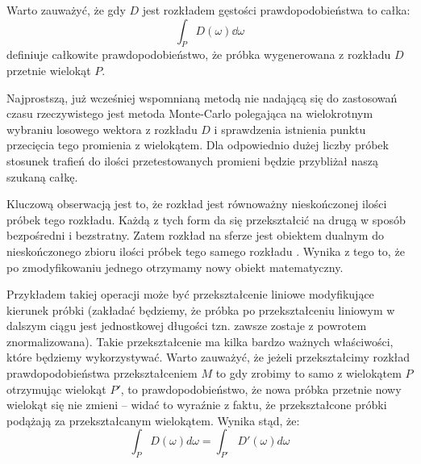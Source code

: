 \documentclass[../main.tex]{subfiles}
\begin{document}
%    

Warto zauważyć, że gdy $D$ jest rozkładem gęstości prawdopodobieństwa to całka:
\[
\int_P {
    D(\omega)
    \dd \omega
}
\]
\noindent definiuje całkowite prawdopodobieństwo, że próbka wygenerowana z rozkładu $D$ przetnie wielokąt $P$.

Najprostszą, już wcześniej wspomnianą metodą nie nadającą się do zastosowań czasu rzeczywistego jest metoda Monte-Carlo polegająca na wielokrotnym wybraniu losowego wektora z rozkładu $D$ i sprawdzenia istnienia punktu przecięcia tego promienia z wielokątem. Dla odpowiednio dużej liczby próbek stosunek trafień do ilości przetestowanych promieni będzie przybliżał naszą szukaną całkę.

Kluczową obserwacją jest to, że rozkład jest równoważny nieskończonej ilości próbek tego rozkładu. Każdą z tych form da się przekształcić na drugą w sposób bezpośredni i bezstratny. Zatem rozkład na sferze jest obiektem dualnym do nieskończonego zbioru ilości próbek tego samego rozkładu \cite{ltc_heitz}. Wynika z tego to, że po zmodyfikowaniu jednego otrzymamy nowy obiekt matematyczny.

Przykładem takiej operacji może być przekształcenie liniowe modyfikujące kierunek próbki (zakładać będziemy, że próbka po przekształceniu liniowym w dalszym ciągu jest jednostkowej długości tzn. zawsze zostaje z powrotem znormalizowana). Takie przekształcenie ma kilka bardzo ważnych właściwości, które będziemy wykorzystywać. Warto zauważyć, że jeżeli przekształcimy rozkład prawdopodobieństwa przekształceniem $M$ to gdy zrobimy to samo z wielokątem $P$ otrzymując wielokąt $P'$, to prawdopodobieństwo, że nowa próbka przetnie nowy wielokąt się nie zmieni – widać to wyraźnie z faktu, że przekształcone próbki podążają za przekształcanym wielokątem. Wynika stąd, że:
\[
\int_P {
  D(\omega)
  d \omega
} = \int_{P'} {
  D'(\omega)
  d\omega
}
\]
\end{document}
